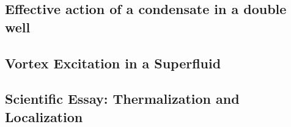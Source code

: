 % 
% 


% 
% 
% 
% 
% 
% 



\setcounter{section}{8}
\setcounter{subsection}{0}
\subsection{Effective action of a condensate in a double well}

\subsection{Vortex Excitation in a Superfluid}


\newpage
\setcounter{section}{9}
\setcounter{subsection}{0}
\subsection{Scientific Essay: Thermalization and Localization}



% 



